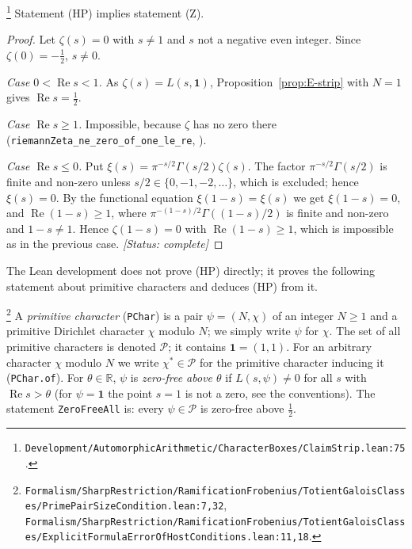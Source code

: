 \begin{proposition}\label{prop:E-zeta}
\footnote{\nolinkurl{Development/AutomorphicArithmetic/CharacterBoxes/ClaimStrip.lean:75}.}%
Statement \textup{(HP)} implies statement \textup{(Z)}.
\end{proposition}
\begin{proof}
Let $\zeta(s)=0$ with $s\neq1$ and $s$ not a negative even integer. Since $\zeta(0)=-\tfrac12$,
$s\neq0$.

\emph{Case $0<\operatorname{Re}s<1$.} As $\zeta(s)=L(s,\mathbf 1)$, Proposition~\ref{prop:E-strip}
with $N=1$ gives $\operatorname{Re}s=\tfrac12$.

\emph{Case $\operatorname{Re}s\ge1$.} Impossible, because $\zeta$ has no zero there
(\texttt{riemannZeta\_ne\_zero\_of\_one\_le\_re}, \cite{E-mathlib-nonvanishing}).

\emph{Case $\operatorname{Re}s\le0$.} Put $\xi(s)=\pi^{-s/2}\Gamma(s/2)\zeta(s)$. The factor
$\pi^{-s/2}\Gamma(s/2)$ is finite and non-zero unless $s/2\in\{0,-1,-2,\dots\}$, which is excluded;
hence $\xi(s)=0$. By the functional equation $\xi(1-s)=\xi(s)$ we get $\xi(1-s)=0$, and
$\operatorname{Re}(1-s)\ge1$, where $\pi^{-(1-s)/2}\Gamma((1-s)/2)$ is finite and non-zero and
$1-s\neq1$. Hence $\zeta(1-s)=0$ with $\operatorname{Re}(1-s)\ge1$, which is impossible as in the
previous case.
\textit{[Status: complete]}
\end{proof}

The Lean development does not prove (HP) directly; it proves the following statement about
primitive characters and deduces (HP) from it.

\begin{definition}\label{def:E-pchar}
\footnote{\nolinkurl{Formalism/SharpRestriction/RamificationFrobenius/TotientGaloisClasses/PrimePairSizeCondition.lean:7,32}, \nolinkurl{Formalism/SharpRestriction/RamificationFrobenius/TotientGaloisClasses/ExplicitFormulaErrorOfHostConditions.lean:11,18}.}%
A \emph{primitive character} (\texttt{PChar}) is a pair $\psi=(N,\chi)$ of an integer $N\ge1$ and a
primitive Dirichlet character $\chi$ modulo $N$; we simply write $\psi$ for $\chi$. The set of all
primitive characters is denoted $\mathcal P$; it contains $\mathbf 1=(1,1)$. For an arbitrary
character $\chi$ modulo $N$ we write $\chi^{*}\in\mathcal P$ for the primitive character inducing it
(\texttt{PChar.of}). For $\theta\in\mathbb R$, $\psi$ is \emph{zero-free above $\theta$} if
$L(s,\psi)\neq0$ for all $s$ with $\operatorname{Re}s>\theta$ (for $\psi=\mathbf 1$ the point $s=1$
is not a zero, see the conventions). The statement \texttt{ZeroFreeAll} is: every
$\psi\in\mathcal P$ is zero-free above $\tfrac12$.
\end{definition}


